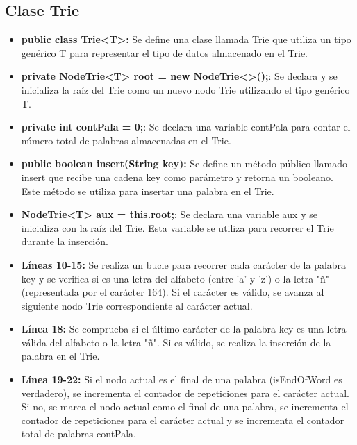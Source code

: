 \documentclass{article}
\begin{document}
	

	\subsection{Clase Trie}
	\begin{itemize}	
		\item \textbf{public class Trie<T>:} Se define una clase llamada Trie que utiliza un tipo genérico T para representar el tipo de datos almacenado en el Trie.

		\item \textbf{private NodeTrie<T> root = new NodeTrie<>();}: Se declara y se inicializa la raíz del Trie como un nuevo nodo Trie utilizando el tipo genérico T.

		\item \textbf{private int contPala = 0;}: Se declara una variable contPala para contar el número total de palabras almacenadas en el Trie.

		\item \textbf{public boolean insert(String key):} Se define un método público llamado insert que recibe una cadena key como parámetro y retorna un booleano. Este método se utiliza para insertar una palabra en el Trie.

		\item \textbf{NodeTrie<T> aux = this.root;}: Se declara una variable aux y se inicializa con la raíz del Trie. Esta variable se utiliza para recorrer el Trie durante la inserción.

		\item \textbf{Líneas 10-15:} Se realiza un bucle para recorrer cada carácter de la palabra key y se verifica si es una letra del alfabeto (entre 'a' y 'z') o la letra "ñ" (representada por el carácter 164). Si el carácter es válido, se avanza al siguiente nodo Trie correspondiente al carácter actual.

		\item \textbf{Línea 18:} Se comprueba si el último carácter de la palabra key es una letra válida del alfabeto o la letra "ñ". Si es válido, se realiza la inserción de la palabra en el Trie.

		\item \textbf{Línea 19-22:} Si el nodo actual es el final de una palabra (isEndOfWord es verdadero), se incrementa el contador de repeticiones para el carácter actual. Si no, se marca el nodo actual como el final de una palabra, se incrementa el contador de repeticiones para el carácter actual y se incrementa el contador total de palabras contPala.


\end{itemize}
\end{document}
